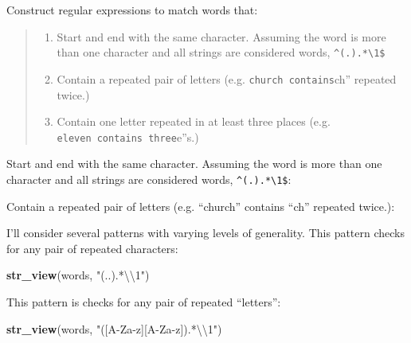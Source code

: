 \documentclass[]{book}
\newenvironment{Shaded}{\begin{snugshade}}{\end{snugshade}}
\newcommand{\CharTok}[1]{\textcolor[rgb]{0.31,0.60,0.02}{#1}}
\newcommand{\KeywordTok}[1]{\textcolor[rgb]{0.13,0.29,0.53}{\textbf{#1}}}
\newcommand{\NormalTok}[1]{#1}
\newcommand{\StringTok}[1]{\textcolor[rgb]{0.31,0.60,0.02}{#1}}
\providecommand{\tightlist}{%
  \setlength{\itemsep}{0pt}\setlength{\parskip}{0pt}}
\theoremstyle{definition}
\theoremstyle{definition}
\theoremstyle{definition}
\theoremstyle{remark}
\begin{document}
Construct regular expressions to match words that:

\begin{quote}
\begin{enumerate}
\def\labelenumi{\arabic{enumi}.}
\tightlist
\item
  Start and end with the same character. Assuming the word is more than
  one character and all strings are considered words,
  \texttt{\^{}(.).*\textbackslash{}1\$}
\item
  Contain a repeated pair of letters (e.g.
  \texttt{church\textquotesingle{}\textquotesingle{}\ contains}ch''
  repeated twice.)
\item
  Contain one letter repeated in at least three places (e.g.
  \texttt{eleven\textquotesingle{}\textquotesingle{}\ contains\ three}e''s.)
\end{enumerate}
\end{quote}

Start and end with the same character. Assuming the word is more than
one character and all strings are considered words,
\texttt{\^{}(.).*\textbackslash{}1\$}:

\begin{Shaded}
\end{Shaded}

Contain a repeated pair of letters (e.g. ``church'' contains ``ch''
repeated twice.):

I'll consider several patterns with varying levels of generality. This
pattern checks for any pair of repeated characters:

\begin{Shaded}
\begin{Highlighting}[]
\KeywordTok{str_view}\NormalTok{(words, }\StringTok{"(..).*}\CharTok{\textbackslash{}\textbackslash{}}\StringTok{1"}\NormalTok{)}
\end{Highlighting}
\end{Shaded}

This pattern is checks for any pair of repeated ``letters'':

\begin{Shaded}
\begin{Highlighting}[]
\KeywordTok{str_view}\NormalTok{(words, }\StringTok{"([A-Za-z][A-Za-z]).*}\CharTok{\textbackslash{}\textbackslash{}}\StringTok{1"}\NormalTok{)}
\end{Highlighting}
\end{Shaded}
\end{document}
